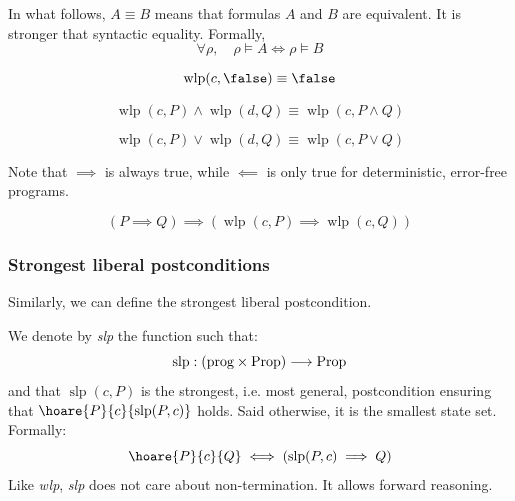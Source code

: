 \documentclass[toc, titlepaged]{../cs-classes/cs-classes}
\DeclareMathOperator{\wlp}{wlp}
\DeclareMathOperator{\slp}{slp}
\begin{document}
In what follows, $A\equiv B$ means that formulas $A$ and $B$ are equivalent. It is stronger that syntactic equality. Formally,
\begin{equation*}
    \forall\rho, \quad \rho \vDash A \iff \rho \vDash B
\end{equation*}

\begin{property}
    \begin{equation*}
        \wlp(c, \false) \equiv \false
    \end{equation*}
\end{property}

\begin{property}
    \begin{equation*}
        \wlp(c, P) \land \wlp(d, Q) \equiv \wlp(c, P\land Q)
    \end{equation*}
\end{property}

\begin{property}
    \begin{equation*}
        \wlp(c, P) \lor \wlp(d, Q) \equiv \wlp(c, P\lor Q)
    \end{equation*}

    \noindent Note that $\implies$ is always true, while $\impliedby$ is only true for deterministic, error-free programs.
\end{property}

\begin{property}[Monotonicity]
    \begin{equation*}
        (P\implies Q) \implies (\wlp(c, P) \implies \wlp(c, Q))
    \end{equation*}
\end{property}


\subsubsection{Strongest liberal postconditions}
Similarly, we can define the strongest liberal postcondition.
\begin{definition}
    We denote by \emph{slp} the function such that:
    \begin{equation*}
        \slp: (\textnormal{prog} \times \textnormal{Prop}) \longrightarrow \textnormal{Prop}
    \end{equation*}
    and that $\slp(c, P)$ is the strongest, i.e. most general, postcondition ensuring that $\hoare{P}{c}{\slp(P, c)}$ holds. Said otherwise, it is the smallest state set. Formally:
    \begin{equation*}
        \hoare{P}{c}{Q} \iff (\slp(P, c)\implies Q)
    \end{equation*}
    Like \emph{wlp}, \emph{slp} does not care about non-termination. It allows forward reasoning.
\end{definition}
\end{document}
